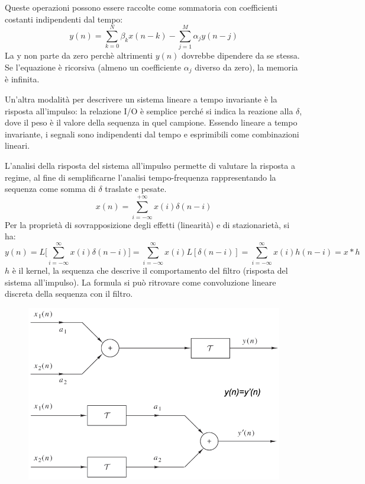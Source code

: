 Queste operazioni possono essere raccolte come sommatoria con coefficienti costanti indipendenti dal tempo:
$$y(n) = \sum_{k=0}^{N} \beta_kx(n - k) - \sum_{j=1}^{M} \alpha_jy(n - j)$$
La y non parte da zero perchè altrimenti $y(n)$ dovrebbe dipendere da se stessa. Se l'equazione è ricorsiva (almeno un coefficiente $\alpha_j$ diverso da zero), la memoria è infinita.

Un'altra modalità per descrivere un sistema lineare a tempo invariante è la risposta all'impulso: la relazione I/O è semplice perché si indica la reazione alla $\delta$, dove il peso è il valore della sequenza in quel campione. Essendo lineare a tempo invariante, i segnali sono indipendenti dal tempo e esprimibili come combinazioni lineari. 

L'analisi della risposta del sistema all'impulso permette di valutare la risposta a regime, al fine di semplificarne l'analisi tempo-frequenza rappresentando la sequenza come somma di $\delta$ traslate e pesate.
$$x(n) = \sum_{i=-\infty}^{+\infty}x(i)\delta(n-i)$$
Per la proprietà di sovrapposizione degli effetti (linearità) e di stazionarietà, si ha:
$$y(n) = L\Big[\sum_{i=-\infty}^{\infty}x(i)\delta(n - i)\Big] = \sum_{i=-\infty}^{\infty}x(i)L[\delta(n - i)] = \sum_{i=-\infty}^{\infty}x(i)h(n - i) = x * h$$
$h$ è il kernel, la sequenza che descrive il comportamento del filtro (risposta del sistema all'impulso). La formula si può ritrovare come convoluzione lineare discreta della sequenza con il filtro.

\begin{figure}[h]
	\centering
	\includegraphics[scale=0.35]{Lezioni/Immagini/sovrapposizione}
\end{figure}

